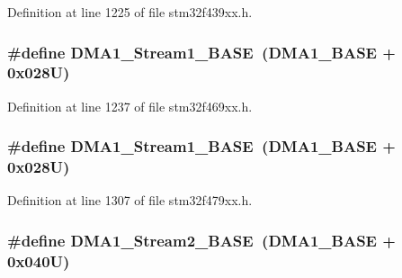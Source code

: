 Definition at line 1225 of file stm32f439xx.\+h.

\subsubsection[{\texorpdfstring{D\+M\+A1\+\_\+\+Stream1\+\_\+\+B\+A\+SE}{DMA1_Stream1_BASE}}]{\setlength{\rightskip}{0pt plus 5cm}\#define D\+M\+A1\+\_\+\+Stream1\+\_\+\+B\+A\+SE~({\bf D\+M\+A1\+\_\+\+B\+A\+SE} + 0x028\+U)}\hypertarget{group___peripheral__memory__map_ga5b4152cef577e37eccc9311d8bdbf3c2}{}\label{group___peripheral__memory__map_ga5b4152cef577e37eccc9311d8bdbf3c2}


Definition at line 1237 of file stm32f469xx.\+h.

\subsubsection[{\texorpdfstring{D\+M\+A1\+\_\+\+Stream1\+\_\+\+B\+A\+SE}{DMA1_Stream1_BASE}}]{\setlength{\rightskip}{0pt plus 5cm}\#define D\+M\+A1\+\_\+\+Stream1\+\_\+\+B\+A\+SE~({\bf D\+M\+A1\+\_\+\+B\+A\+SE} + 0x028\+U)}\hypertarget{group___peripheral__memory__map_ga5b4152cef577e37eccc9311d8bdbf3c2}{}\label{group___peripheral__memory__map_ga5b4152cef577e37eccc9311d8bdbf3c2}


Definition at line 1307 of file stm32f479xx.\+h.

\subsubsection[{\texorpdfstring{D\+M\+A1\+\_\+\+Stream2\+\_\+\+B\+A\+SE}{DMA1_Stream2_BASE}}]{\setlength{\rightskip}{0pt plus 5cm}\#define D\+M\+A1\+\_\+\+Stream2\+\_\+\+B\+A\+SE~({\bf D\+M\+A1\+\_\+\+B\+A\+SE} + 0x040\+U)}\hypertarget{group___peripheral__memory__map_ga48a551ee91d3f07dd74347fdb35c703d}{}\label{group___peripheral__memory__map_ga48a551ee91d3f07dd74347fdb35c703d}



